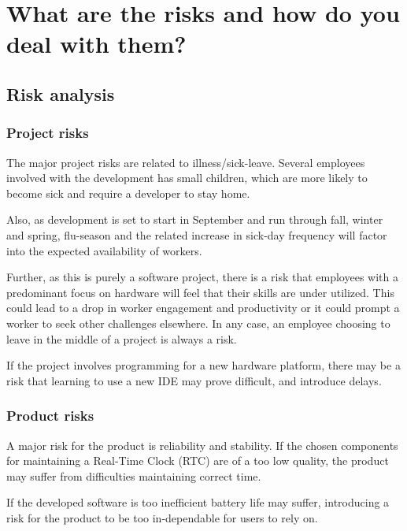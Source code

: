 \documentclass[Main]{subfiles}
\begin{document}
\section{What are the risks and how do you deal with them?}

	\subsection{Risk analysis} %
	\label{sub:risk_analysis}

		\subsubsection{Project risks} %
		\label{sub:project_risks}

		The major project risks are related to illness/sick-leave.
		Several employees involved with the development has small children, which are more likely to become sick and require a developer to stay home.

		Also, as development is set to start in September and run through fall, winter and spring, flu-season and the related increase in sick-day frequency will factor into the expected availability of workers.

		Further, as this is purely a software project, there is a risk that employees with a predominant focus on hardware will feel that their skills are under utilized. 
		This could lead to a drop in worker engagement and productivity or it could prompt a worker to seek other challenges elsewhere.
		In any case, an employee choosing to leave in the middle of a project is always a risk.

		If the project involves programming for a new hardware platform, there may be a risk that learning to use a new IDE may prove difficult, and introduce delays.


		\subsubsection{Product risks} %
		\label{sub:product_risks}

		A major risk for the product is reliability and stability.
		If the chosen components for maintaining a Real-Time Clock (RTC) are of a too low quality, the product may suffer from difficulties maintaining correct time.

		If the developed software is too inefficient battery life may suffer, introducing a risk for the product to be too in-dependable for users to rely on.
\end{document}
